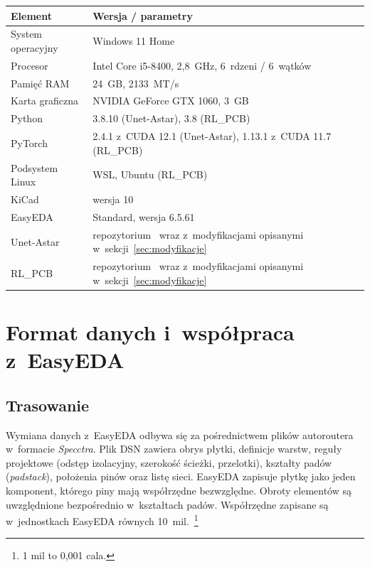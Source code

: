 \begin{table}[ht]
\label{tab:srodowisko}
\centering\footnotesize%
\begin{tabular}{p{} p{}}
\toprule
Element & Wersja / parametry \\
\midrule
System operacyjny & Windows 11 Home \\
\midrule
Procesor & Intel Core i5-8400, 2,8~GHz, 6~rdzeni / 6~wątków \\
\midrule
Pamięć RAM & 24~GB, 2133~MT/s \\
\midrule
Karta graficzna & NVIDIA GeForce GTX 1060, 3~GB \\
\midrule
Python & 3.8.10 (Unet-Astar), 3.8 (RL\_PCB) \\
\midrule
PyTorch & 2.4.1 z~CUDA 12.1 (Unet-Astar), 1.13.1 z~CUDA 11.7 (RL\_PCB) \\
\midrule
Podsystem Linux & WSL, Ubuntu (RL\_PCB) \\
\midrule
KiCad & wersja 10 \\
\midrule
EasyEDA & Standard, wersja 6.5.61 \\
\midrule
Unet-Astar & repozytorium~\cite{Firesuiry_UnetAstar_GitHub} wraz
  z~modyfikacjami opisanymi w~sekcji~\ref{sec:modyfikacje} \\
\midrule
RL\_PCB & repozytorium~\cite{Vassallo_RLPCB_GitHub} wraz
  z~modyfikacjami opisanymi w~sekcji~\ref{sec:modyfikacje} \\
\bottomrule
\end{tabular}
\end{table}

\section{Format danych i~współpraca z~EasyEDA}
\label{sec:format-danych}


\subsection{Trasowanie}
\label{sec:format-trasowanie}

Wymiana danych z~EasyEDA odbywa się za pośrednictwem plików autoroutera
w~formacie \emph{Specctra}. Plik DSN zawiera obrys płytki, definicje warstw,
reguły projektowe (odstęp izolacyjny, szerokość ścieżki, przelotki), kształty
padów (\emph{padstack}), położenia pinów oraz listę sieci. EasyEDA zapisuje
płytkę jako jeden komponent, którego piny mają współrzędne bezwzględne.
Obroty elementów są uwzględnione bezpośrednio w~kształtach padów.
Współrzędne zapisane są w~jednostkach EasyEDA równych 10~mil.~\footnote{1 mil to 0,001 cala.}

